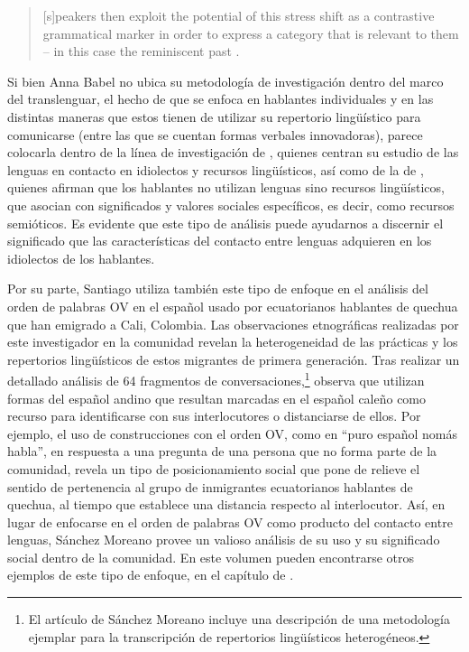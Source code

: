 \documentclass[output=paper]{langscibook}
\begin{document}
\begin{quote}
[s]peakers then exploit the potential of this stress shift as a contrastive grammatical marker in order to express a category that is relevant to them -- in this case the reminiscent past \citep[330]{Babel2014time}.
\end{quote}

Si bien Anna Babel no ubica su metodología de investigación dentro del marco del translenguar, el hecho de que se enfoca en hablantes individuales y en las distintas maneras que estos tienen de utilizar su repertorio lingüístico para comunicarse (entre las que se cuentan formas verbales innovadoras), parece colocarla dentro de la línea de investigación de \citet{OtheguyGarcíaReid2018}, quienes centran su estudio de las lenguas en contacto en idiolectos y recursos lingüísticos, así como de la de \citet{JørgensenEtAl2011}, quienes afirman que los hablantes no utilizan lenguas sino recursos lingüísticos, que asocian con significados y valores sociales específicos, es decir, como recursos semióticos. Es evidente que este tipo de análisis puede ayudarnos a discernir el significado que las características del contacto entre lenguas adquieren en los idiolectos de los hablantes.

Por su parte, Santiago  \citet{SánchezMoreano2017} utiliza también este tipo de enfoque en el análisis del orden de palabras OV en el español usado por ecuatorianos hablantes de quechua que han emigrado a Cali, Colombia. Las observaciones etnográficas realizadas por este investigador en la comunidad revelan la heterogeneidad de las prácticas y los repertorios lingüísticos de estos migrantes de primera generación. Tras realizar un detallado análisis de 64 fragmentos de conversaciones,\footnote{El artículo de Sánchez Moreano incluye una descripción de una metodología ejemplar para la transcripción de repertorios lingüísticos heterogéneos.} observa que utilizan formas del español andino que resultan marcadas en el español caleño como recurso para identificarse con sus interlocutores o distanciarse de ellos. Por ejemplo, el uso de construcciones con el orden OV, como en “puro español nomás habla”, en respuesta a una pregunta de una persona que no forma parte de la comunidad, revela un tipo de posicionamiento social que pone de relieve el sentido de pertenencia al grupo de inmigrantes ecuatorianos hablantes de quechua, al tiempo que establece una distancia respecto al interlocutor. Así, en lugar de enfocarse en el orden de palabras OV como producto del contacto entre lenguas, Sánchez Moreano provee un valioso análisis de su uso y su significado social dentro de la comunidad. En este volumen pueden encontrarse otros ejemplos de este tipo de enfoque, en el capítulo de .
\end{document}
